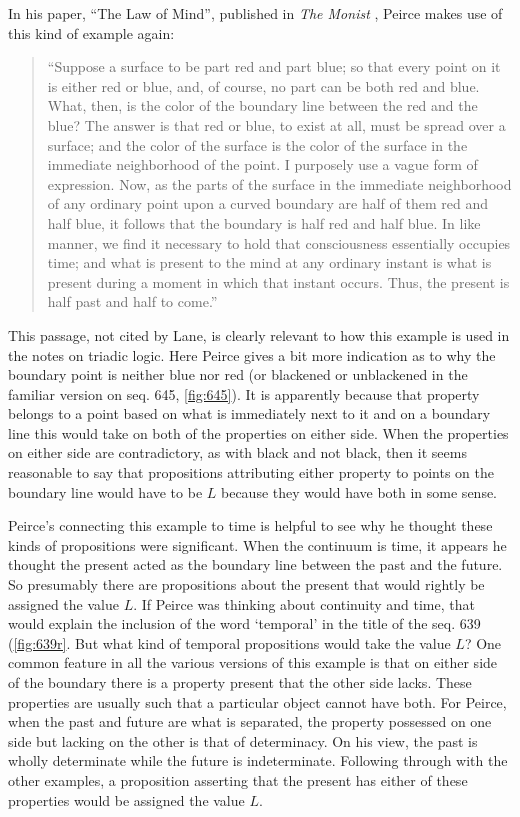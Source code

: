 In his paper, ``The Law of Mind'', published in \textit{The Monist} \citeyear{peirce1892law}, Peirce makes use of this kind of example again:
\begin{quotation}
\noindent``Suppose a surface to be part red and part blue; so that every point on it is either red or blue, and, of course, no part can be both red and blue. What, then, is the color of the boundary line between the red and the blue? The answer is that red or blue, to exist at all, must be spread over a surface; and the color of the surface is the color of the surface in the immediate neighborhood of the point. I purposely use a vague form of expression. Now, as the parts of the surface in the immediate neighborhood of any ordinary point upon a curved boundary are half of them red and half blue, it follows that the boundary is half red and half blue. In like manner, we find it necessary to hold that consciousness essentially occupies time; and what is present to the mind at any ordinary instant is what is present during a moment in which that instant occurs. Thus, the present is half past and half to come.''
\end{quotation}
\noindent This passage, not cited by Lane, is clearly relevant to how this example is used in the notes on triadic logic. Here Peirce gives a bit more indication as to why the boundary point is neither blue nor red (or blackened or unblackened in the familiar version on seq. 645, \ref{fig:645}). It is apparently because that property belongs to a point based on what is immediately next to it and on a boundary line this would take on both of the properties on either side. When the properties on either side are contradictory, as with black and not black, then it seems reasonable to say that propositions attributing either property to points on the boundary line would have to be $L$ because they would have both in some sense. 

Peirce's connecting this example to time is helpful to see why he thought these kinds of propositions were significant. When the continuum is time, it appears he thought the present acted as the boundary line between the past and the future. So presumably there are propositions about the present that would rightly be assigned the value $L$. If Peirce was thinking about continuity and time, that would explain the inclusion of the word `temporal' in the title of the seq. 639 (\ref{fig:639r}. But what kind of temporal propositions would take the value $L$? One common feature in all the various versions of this example is that on either side of the boundary there is a property present that the other side lacks. These properties are usually such that a particular object cannot have both. For Peirce, when the past and future are what is separated, the property possessed on one side but lacking on the other is that of determinacy. On his view, the past is wholly determinate while the future is indeterminate. Following through with the other examples, a proposition asserting that the present has either of these properties would be assigned the value $L$.

